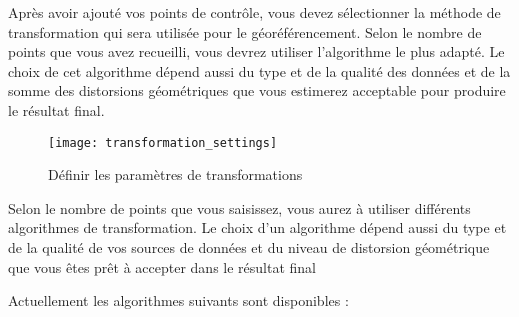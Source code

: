 Après avoir ajouté vos points de contrôle, vous devez sélectionner la méthode de transformation qui sera utilisée pour le géoréférencement. Selon le nombre de points que vous avez recueilli, vous devrez utiliser l'algorithme le plus adapté. Le choix de cet algorithme dépend aussi du type et de la qualité des données et de la somme des distorsions géométriques que vous estimerez acceptable pour produire le résultat final.

\begin{figure}[ht]
\centering
  \texttt{[image: transformation\_settings]}
  \caption{Définir les paramètres de transformations \nixcaption}\label{fig:georef_transform}
\end{figure}



Selon le nombre de points que vous saisissez, vous aurez à utiliser différents algorithmes de transformation. Le choix d'un algorithme dépend aussi du type et de la qualité de vos sources de données et du niveau de distorsion géométrique que vous êtes prêt à accepter dans le résultat final

Actuellement les algorithmes suivants sont disponibles :

